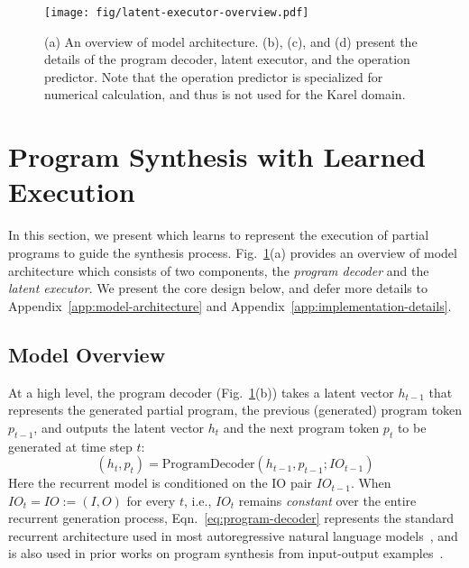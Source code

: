 \begin{figure}
    \centering
    \texttt{[image: fig/latent-executor-overview.pdf]}
    \caption{\small (a) An overview of \ours{} model architecture. (b), (c), and (d) present the details of the program decoder, latent executor, and the operation predictor. Note that the operation predictor is specialized for numerical calculation, and thus is not used for the Karel domain.}
    \label{fig:model-architecture}
    \vspace{-1em}
\end{figure}

\def\cL{\mathcal{L}}

\section{Program Synthesis with Learned Execution}
\vspace{-0.1in}
\label{sec:model-architecture}
In this section, we present \ours{} which learns to represent the execution of partial programs to guide the synthesis process. Fig.~\ref{fig:model-architecture}(a) provides an overview of \ours{} model architecture which consists of two components, the \emph{program decoder} and the \emph{latent executor}. We present the core design below, and defer more details to Appendix~\ref{app:model-architecture} and Appendix~\ref{app:implementation-details}. 

\subsection{Model Overview}
\vspace{-0.1in}
At a high level, the program decoder (Fig.~\ref{fig:model-architecture}(b)) takes a latent vector $h_{t-1}$ that represents the generated partial program, the previous (generated) program token $p_{t-1}$, and outputs the latent vector $h_t$ and the next program token $p_t$ to be generated at time step $t$: 
\begin{equation}
(h_t, p_t) = \mathrm{ProgramDecoder}(h_{t-1}, p_{t-1}; IO_{t-1}) \label{eq:program-decoder}
\end{equation}
Here the recurrent model is conditioned on the IO pair $IO_{t-1}$. When $IO_t = IO := (I, O)$ for every $t$, i.e., $IO_t$ remains \emph{constant} over the entire recurrent generation process, Eqn.~\ref{eq:program-decoder} represents the standard recurrent architecture used in most autoregressive natural language models~\cite{hochreiter1997long,vaswani2017attention}, and is also used in prior works on program synthesis from input-output examples~\cite{devlin2017robustfill,bunel2018leveraging}. 

